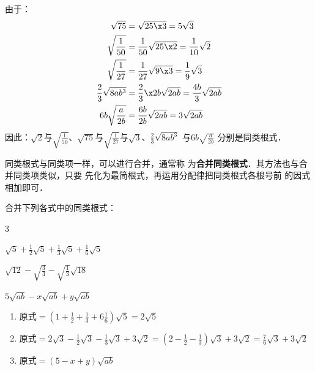 \begin{solution}
由于：
\[\begin{split}
    \sqrt{75}&=\sqrt{25\x 3}=5\sqrt{3}\\
    \sqrt{\frac{1}{50}}&=\frac{1}{50}\sqrt{25\x 2}=\frac{1}{10}\sqrt{2}    \\
    \sqrt{\frac{1}{27}}&=\frac{1}{27}\sqrt{9\x 3}=\frac{1}{9}\sqrt{3}    \\
    \frac{2}{3}\sqrt{8ab^3}&=\frac{2}{3}\x 2b\sqrt{2ab}=\frac{4b}{3}\sqrt{2ab}    \\
    6b\sqrt{\frac{a}{2b}}&=\frac{6b}{2b}\sqrt{2ab}=3\sqrt{2ab}    \\
\end{split}\]
因此：$\sqrt{2}$与$\sqrt{\frac{1}{50}}$、$\sqrt{75}$与$\sqrt{\frac{1}{27}}$与$\sqrt{3}$、$\frac{2}{3}\sqrt{8ab^3}$
与$6b\sqrt{\frac{a}{2b}}$ 分别是同类根式． 
\end{solution}

同类根式与同类项一样，可以进行合并，通常称
为\textbf{合并同类根式}．其方法也与合并同类项类似，只要
先化为最简根式，再运用分配律把同类根式各根号前
的因式相加即可．

\begin{example}
    合并下列各式中的同类根式：
\begin{enumerate}
    \begin{multicols}{3}
    \item $\sqrt{5}+\frac{1}{2}\sqrt{5}+\frac{1}{3}\sqrt{5}+\frac{1}{6}\sqrt{5}$
    \item $\sqrt{12}-\sqrt{\frac{3}{4}}-\sqrt{\frac{1}{3}}\sqrt{18}$
    \item $5\sqrt{ab}-x\sqrt{ab}+y\sqrt{ab}$
    \end{multicols}
\end{enumerate}
\end{example}

\begin{solution}
\begin{enumerate}
    \item $\text{原式}=\left(1+\frac{1}{2}+\frac{1}{3}+6\frac{1}{6}\right)\sqrt{5}
        =2\sqrt{5}$
    \item $\text{原式}=2\sqrt{3}-\frac{1}{2}\sqrt{3}-\frac{1}{3}\sqrt{3}+3\sqrt{2}
        =\left(2-\frac{1}{2}-\frac{1}{3}\right)\sqrt{3}+3\sqrt{2}
        =\frac{7}{6}\sqrt{3}+3\sqrt{2}$
    \item $\text{原式}=(5-x+y)\sqrt{ab}$
\end{enumerate}
\end{solution}

